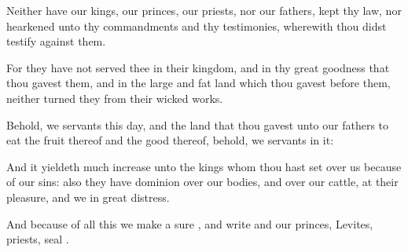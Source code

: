 {Neither have our
kings, our
princes, our
priests, nor our
fathers,
kept thy
law, nor
hearkened unto thy
commandments and thy
testimonies, wherewith thou didst
testify against them.

For they have not
served thee in their
kingdom, and in thy
great
goodness that thou
gavest them, and in the
large and
fat
land which thou
gavest
before them, neither
turned they from their
wicked
works.

Behold, we
{}
servants this
day, and
{} the
land that thou
gavest unto our
fathers to
eat the
fruit thereof and the
good thereof, behold, we
{}
servants in it:

And it yieldeth
much
increase unto the
kings whom thou hast
set over us because of our
sins: also they have
dominion over our
bodies, and over our
cattle, at their
pleasure, and we
{} in
great
distress.

And because of all this we
make a
sure
{}, and
write
{} and our
princes,
Levites,
{}
priests,
seal
{}.




\par }
